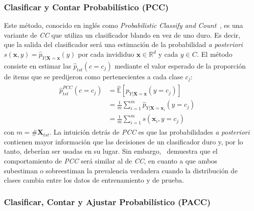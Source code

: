 \subsubsection{Clasificar y Contar Probabilístico (PCC)}

Este método, conocido en inglés como {\it Probabilistic Classify and
Count\/}~\cite{bella2010quantification, tang2010network}, es una variante de
{\it CC\/} que utiliza un clasificador blando en vez de uno duro. Es decir, que
la salida del clasificador será una estimación de la probabilidad {\it a
posteriori\/} $s(\boldsymbol{x}, y) =
\hat{p}_{Y|\boldsymbol{X}=\boldsymbol{x}}(y)$ por cada invididuo $\boldsymbol{x}
\in \mathbb{R}^d$ y cada $y \in C$. El método consiste en estimar las
$\hat{p}_{tst}(c=c_j)$ mediante el valor esperado de la proporción de items que
se predijeron como pertenecientes a cada clase $c_j$:
\begin{align}
\begin{split}
    \hat p^{PCC}_{tst}(c=c_j) &= \mathbb{\hat E}[p_{Y|\boldsymbol{X}=\boldsymbol{x}}(y=c_j)] \\
    &= \frac{1}{m} \sum \limits_{i=1}^{m}{\hat p_{Y|\boldsymbol{X}=\boldsymbol{x}_i}(y=c_j)} \\
    &= \frac{1}{m} \sum \limits_{i=1}^{m}{s(\boldsymbol{x}_i, y=c_j)}
\end{split}
\end{align}
con $m=\#\boldsymbol{X}_{tst}$. La intuición detrás de {\it PCC\/} es que las
probabilidades {\it a posteriori\/} contienen mayor información que las
decisiones de un clasificador duro y, por lo tanto, deberían ser usadas en su
lugar. Sin embargo,~\citet[Corolario 6, p. 157 y p.163]{tasche2014exact}
demuestra que el comportamiento de {\it PCC\/} será similar al de {\it CC}, en
cuanto a que ambos subestiman o sobreestiman la prevalencia verdadera cuando la
distribución de clases cambia entre los datos de entrenamiento y de prueba.

\subsubsection{Clasificar, Contar y Ajustar Probabilístico (PACC)}

